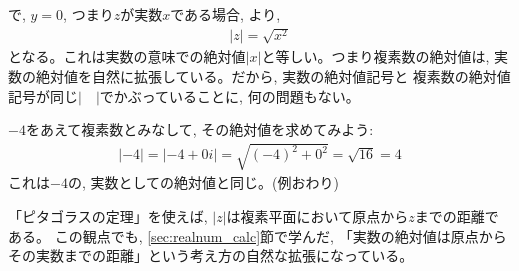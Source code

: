 で, $y=0$, つまり$z$が実数$x$である場合, 
より, 
\begin{eqnarray}|z|=\sqrt{x^2}\end{eqnarray}
となる。これは実数の意味での絶対値$|x|$と等しい。つまり複素数の絶対値は, 
実数の絶対値を自然に拡張している。だから, 実数の絶対値記号と
複素数の絶対値記号が同じ$|\quad|$でかぶっていることに, 何の問題もない。

\begin{exmpl} $-4$をあえて複素数とみなして, その絶対値を求めてみよう:
\begin{eqnarray*}|-4|=|-4+0i|=\sqrt{(-4)^2+0^2}=\sqrt{16}=4\end{eqnarray*}
これは$-4$の, 実数としての絶対値と同じ。(例おわり)
\end{exmpl}

「ピタゴラスの定理」を使えば, $|z|$は複素平面において原点から$z$までの距離である。
この観点でも, \ref{sec:realnum_calc}節で学んだ, 「実数の絶対値は原点から
その実数までの距離」という考え方の自然な拡張になっている。

